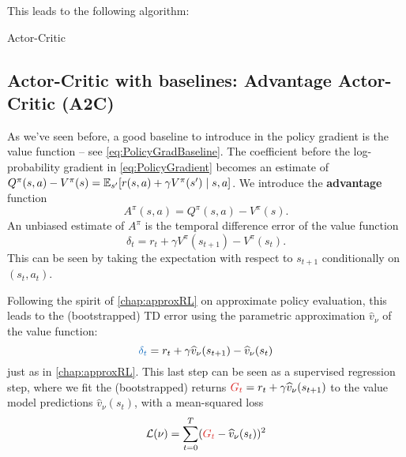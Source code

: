 \documentclass[../course-notes.tex]{subfiles}
\begin{document}
This leads to the following algorithm:

\begin{algorithm}[H]
	\caption{Actor-Critic}\label{algo:BaseActorCritic}
\end{algorithm}



\subsection{Actor-Critic with baselines: Advantage Actor-Critic (A2C)}

As we've seen before, a good baseline to introduce in the policy gradient is the value function -- see \cref{eq:PolicyGradBaseline}.
The coefficient before the log-probability gradient in \eqref{eq:PolicyGradient} becomes an estimate of $Q^\pi(s,a) - V^\pi(s) = \operatorname{\mathbb{E}}_{s'}[r(s,a) + \gamma V^\pi(s')\mid s,a]$. We introduce the \textbf{advantage} function
\begin{equation}\label{eq:AdvantageDefn}
A^\pi(s,a) = Q^\pi(s,a) - V^\pi(s).
\end{equation}
An unbiased estimate of $A^\pi$ is the temporal difference error of the value function
\[
\delta_t = r_t + \gamma V^\pi(s_{t+1}) - V^\pi(s_t).
\]
This can be seen by taking the expectation with respect to $s_{t+1}$ conditionally on $(s_t,a_t)$.


Following the spirit of \cref{chap:approxRL} on approximate policy evaluation, this leads to the (bootstrapped) TD error using the parametric approximation $\widehat{v}_\nu$ of the value function:
\begin{equation}
	{\bluefont \delta_t} = r_t + \gamma\widehat{v}_\nu(s_{t+1}) - \widehat{v}_\nu(s_t)
\end{equation}
just as in \cref{chap:approxRL}.
This last step can be seen as a supervised regression step, where we fit the (bootstrapped) returns ${\redfont G_{t}} = r_t + \gamma\widehat{v}_\nu(s_{t+1})$ to the value model predictions $\widehat{v}_\nu(s_t)$, with a mean-squared loss
\begin{equation}
	\calL(\nu) = \sum_{t=0}^T ({\redfont G_{t}} - \widehat{v}_{\nu}(s_t))^2
\end{equation}
\end{document}
